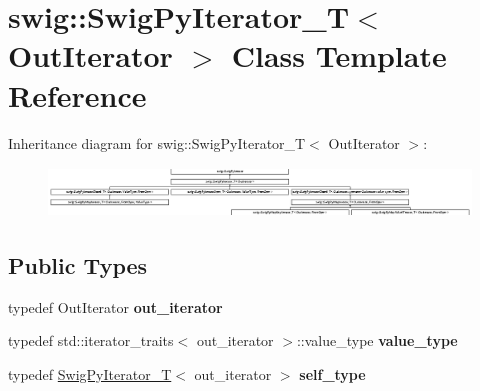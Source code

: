 \hypertarget{classswig_1_1_swig_py_iterator___t}{}\section{swig\+:\+:Swig\+Py\+Iterator\+\_\+T$<$ Out\+Iterator $>$ Class Template Reference}
\label{classswig_1_1_swig_py_iterator___t}
Inheritance diagram for swig\+:\+:Swig\+Py\+Iterator\+\_\+T$<$ Out\+Iterator $>$\+:\begin{figure}[H]
\begin{center}
\leavevmode
\includegraphics[height=1.313321cm]{classswig_1_1_swig_py_iterator___t}
\end{center}
\end{figure}
\subsection*{Public Types}
\begin{DoxyCompactItemize}
\item 
\mbox{\label{classswig_1_1_swig_py_iterator___t_aec35545038c3d804975a147253f061e4}} 
typedef Out\+Iterator {\bfseries out\+\_\+iterator}
\item 
\mbox{\label{classswig_1_1_swig_py_iterator___t_a1441e2409c41706ad7aee977165f675e}} 
typedef std\+::iterator\+\_\+traits$<$ out\+\_\+iterator $>$\+::value\+\_\+type {\bfseries value\+\_\+type}
\item 
\mbox{\label{classswig_1_1_swig_py_iterator___t_af10eb8078eb41f1dbca3701f27bd8e73}} 
typedef \hyperlink{classswig_1_1_swig_py_iterator___t}{Swig\+Py\+Iterator\+\_\+T}$<$ out\+\_\+iterator $>$ {\bfseries self\+\_\+type}
\end{DoxyCompactItemize}
